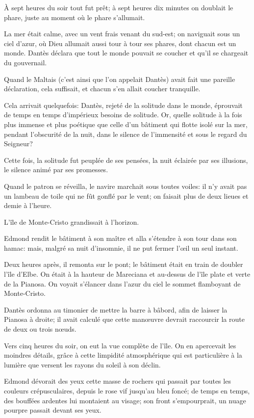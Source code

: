 À sept heures du soir tout fut prêt; à sept heures dix minutes on doublait le phare, juste au moment où le phare s'allumait.

La mer était calme, avec un vent frais venant du sud-est; on naviguait sous un ciel d'azur, où Dieu allumait aussi tour à tour ses phares, dont chacun est un monde. Dantès déclara que tout le monde pouvait se coucher et qu'il se chargeait du gouvernail.

Quand le Maltais (c'est ainsi que l'on appelait Dantès) avait fait une pareille déclaration, cela suffisait, et chacun s'en allait coucher tranquille.

Cela arrivait quelquefois: Dantès, rejeté de la solitude dans le monde, éprouvait de temps en temps d'impérieux besoins de solitude. Or, quelle solitude à la fois plus immense et plus poétique que celle d'un bâtiment qui flotte isolé sur la mer, pendant l'obscurité de la nuit, dans le silence de l'immensité et sous le regard du Seigneur?

Cette fois, la solitude fut peuplée de ses pensées, la nuit éclairée par ses illusions, le silence animé par ses promesses.

Quand le patron se réveilla, le navire marchait sous toutes voiles: il n'y avait pas un lambeau de toile qui ne fût gonflé par le vent; on faisait plus de deux lieues et demie à l'heure.

L'île de Monte-Cristo grandissait à l'horizon.

Edmond rendit le bâtiment à son maître et alla s'étendre à son tour dans son hamac: mais, malgré sa nuit d'insomnie, il ne put fermer l'œil un seul instant.

Deux heures après, il remonta sur le pont; le bâtiment était en train de doubler l'île d'Elbe. On était à la hauteur de Mareciana et au-dessus de l'île plate et verte de la Pianosa. On voyait s'élancer dans l'azur du ciel le sommet flamboyant de Monte-Cristo.

Dantès ordonna au timonier de mettre la barre à bâbord, afin de laisser la Pianosa à droite; il avait calculé que cette manœuvre devrait raccourcir la route de deux ou trois nœuds.

Vers cinq heures du soir, on eut la vue complète de l'île. On en apercevait les moindres détails, grâce à cette limpidité atmosphérique qui est particulière à la lumière que versent les rayons du soleil à son déclin.

Edmond dévorait des yeux cette masse de rochers qui passait par toutes les couleurs crépusculaires, depuis le rose vif jusqu'au bleu foncé; de temps en temps, des bouffées ardentes lui montaient au visage; son front s'empourprait, un nuage pourpre passait devant ses yeux.

